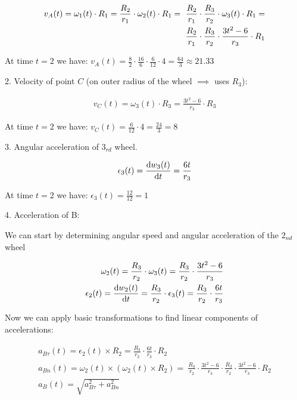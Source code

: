 \documentclass{article}
\begin{document}
\begin{align}
    v_A(t) = \omega_1(t) \cdot R_1 = \frac{R_2}{r_1} \cdot \omega_2(t) \cdot {R_1} = \
    \frac{R_2}{r_1} \cdot \frac{R_3}{r_2} \cdot \omega_3(t) \cdot {R_1} = \notag \\
    \frac{R_2}{r_1} \cdot \frac{R_3}{r_2} \cdot \frac{3t^2 - 6}{r_3} \cdot {R_1}
\end{align}

At time $t = 2$ we have: $v_A(t) = \frac{8}{2} \cdot \frac{16}{6} \cdot \frac{6}{12} \cdot 4 = \frac{64}{3} \approx 21.33$

2. Velocity of point $C$ (on outer radius of the wheel $\implies$ uses $R_3$):

\begin{align}
    v_C(t) = \omega_3(t) \cdot R_3 = \frac{3t^2 - 6}{r_3} \cdot {R_3}
\end{align}

At time $t = 2$ we have: $v_C(t) = \frac{6}{12} \cdot 4 = \frac{24}{3} = 8$

3. Angular acceleration of $3_{rd}$ wheel.

\begin{align}
    \epsilon_3(t) = \dv{w_3(t)}{t} = \frac{6t}{r_3}
\end{align}

At time $t = 2$ we have: $\epsilon_3(t) = \frac{12}{12} = 1$

4. Acceleration of B:

We can start by determining angular speed and angular acceleration of the $2_{nd}$ wheel

\begin{align}
    \omega_2(t) = \frac{R_3}{r_2} \cdot \omega_3(t) = \frac{R_3}{r_2} \cdot \frac{3t^2 - 6}{r_3} \\
    \epsilon_2(t) = \dv{w_2(t)}{t} = \frac{R_3}{r_2} \cdot \epsilon_3(t) = \frac{R_3}{r_2} \cdot \frac{6t}{r_3}
\end{align}

Now we can apply basic transformations to find linear components of accelerations:

\begin{align}
    a_{B\tau}(t) = \epsilon_2(t) \times R_2 = \frac{R_3}{r_2} \cdot \frac{6t}{r_3} \cdot R_2              \\
    a_{Bn}(t) = \omega_2(t) \times ( \omega_2(t) \times R_2 ) = \
    \frac{R_3}{r_2} \cdot \frac{3t^2 - 6}{r_3} \cdot \frac{R_3}{r_2} \cdot \frac{3t^2 - 6}{r_3} \cdot R_2 \\
    a_{B}(t) = \sqrt{a_{B\tau}^2 + a_{Bn}^2}
\end{align}
\end{document}
